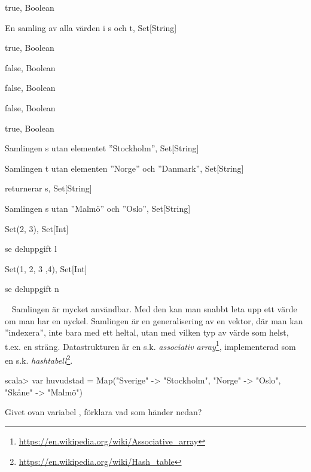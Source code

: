 {{\Subtask {}

\Subtask {}

\Subtask {}

\Subtask {}

\Subtask {}

\Subtask {}

\Subtask {}


\SOLUTION


\TaskSolved \what


\SubtaskSolved
true, Boolean

\SubtaskSolved
En samling av alla värden i s och t, Set[String]

\SubtaskSolved
true, Boolean

\SubtaskSolved
false, Boolean

\SubtaskSolved
false, Boolean

\SubtaskSolved
false, Boolean

\SubtaskSolved
true, Boolean

\SubtaskSolved
Samlingen s utan elementet ''Stockholm'', Set[String]

\SubtaskSolved
Samlingen t utan elementen ''Norge'' och ''Danmark'', Set[String]

\SubtaskSolved
returnerar s, Set[String]

\SubtaskSolved
Samlingen s utan ''Malmö'' och ''Oslo'', Set[String]

\SubtaskSolved
Set(2, 3), Set[Int]

\SubtaskSolved
se deluppgift l

\SubtaskSolved
Set(1, 2, 3 ,4), Set[Int]

\SubtaskSolved
se deluppgift n


\QUESTEND









\QUESTBEGIN

\Task  \what~  Samlingen  är mycket användbar. Med den kan man snabbt leta upp ett värde om man har en nyckel. Samlingen  är en generalisering av en vektor, där man kan ''indexera'', inte bara med ett heltal, utan med vilken typ av värde som helst, t.ex. en sträng. Datastrukturen  är en s.k. \emph{associativ array}\footnote{\href{https://en.wikipedia.org/wiki/Associative_array}{https://en.wikipedia.org/wiki/Associative\_array}}, implementerad som en s.k. \emph{hashtabell}\footnote{\href{https://en.wikipedia.org/wiki/Hash_table}{https://en.wikipedia.org/wiki/Hash\_table}}.
\begin{REPL}
scala> var huvudstad =
  Map("Sverige" -> "Stockholm", "Norge" -> "Oslo", "Skåne" -> "Malmö")
\end{REPL}
Givet ovan variabel , förklara vad som händer nedan?

}}
